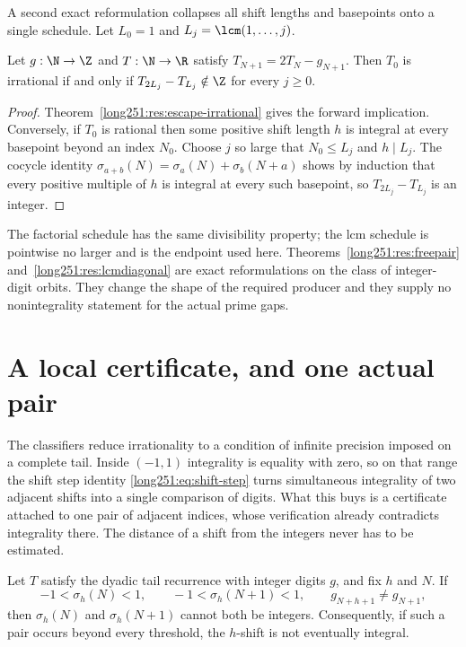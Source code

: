 \documentclass[11pt]{article}
\begin{document}
A second exact reformulation collapses all shift lengths and basepoints onto a
single schedule.  Let $L_0=1$ and $L_j=\lcm(1,\ldots,j)$.

\begin{theorem}\label{long251:res:lcmdiagonal}
Let $g:\N\to\Z$ and $T:\N\to\R$ satisfy $T_{N+1}=2T_N-g_{N+1}$.  Then
$T_0$ is irrational if and only if
$T_{2L_j}-T_{L_j}\notin\Z$ for every $j\ge0$.
\end{theorem}

\begin{proof}
Theorem~\ref{long251:res:escape-irrational} gives the forward implication.  Conversely,
if $T_0$ is rational then some positive shift length $h$ is integral at every
basepoint beyond an index $N_0$.  Choose $j$ so large that $N_0\le L_j$ and
$h\mid L_j$.  The cocycle identity
$\sigma_{a+b}(N)=\sigma_a(N)+\sigma_b(N+a)$ shows by induction that every
positive multiple of $h$ is integral at every such basepoint, so
$T_{2L_j}-T_{L_j}$ is an integer.
\end{proof}

The factorial schedule has the same divisibility property; the lcm schedule is
pointwise no larger and is the endpoint used here.  Theorems~\ref{long251:res:freepair}
and~\ref{long251:res:lcmdiagonal} are exact reformulations on the class of
integer-digit orbits.  They change the shape of the required producer and they
supply no nonintegrality statement for the actual prime gaps.

\section{A local certificate, and one actual pair}\label{long251:sec:local-certificate}

The classifiers reduce irrationality to a condition of infinite precision
imposed on a complete tail.  Inside $(-1,1)$ integrality is equality with zero,
so on that range the shift step identity \eqref{long251:eq:shift-step} turns
simultaneous integrality of two adjacent shifts into a single comparison of
digits.  What this buys is a certificate attached to one pair of adjacent
indices, whose verification already contradicts integrality there.  The
distance of a shift from the integers never has to be estimated.

\begin{theorem}\label{long251:res:smallpair}
Let $T$ satisfy the dyadic tail recurrence with integer digits $g$, and fix
$h$ and $N$.  If
\[
 -1<\sigma_h(N)<1,\qquad -1<\sigma_h(N+1)<1,
 \qquad g_{N+h+1}\ne g_{N+1},
\]
then $\sigma_h(N)$ and $\sigma_h(N+1)$ cannot both be integers.  Consequently,
if such a pair occurs beyond every threshold, the $h$-shift is not eventually
integral.
\end{theorem}
\end{document}
